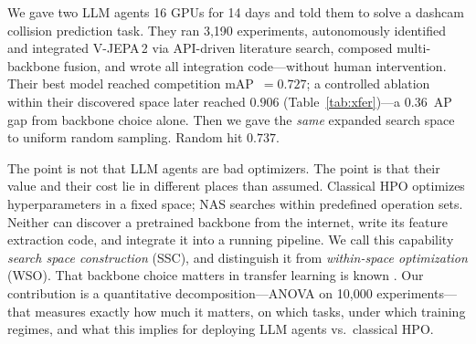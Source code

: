 \documentclass{article}
\begin{document}
We gave two LLM agents 16 GPUs for 14 days and told them to solve a dashcam collision prediction task.
They ran 3{,}190 experiments, autonomously identified and integrated V-JEPA\,2 via API-driven literature search, composed multi-backbone fusion, and wrote all integration code---without human intervention.
Their best model reached competition mAP~$= 0.727$; a controlled ablation within their discovered space later reached $0.906$ (Table~\ref{tab:xfer})---a 0.36~AP gap from backbone choice alone.
Then we gave the \emph{same} expanded search space to uniform random sampling.
Random hit $0.737$.

The point is not that LLM agents are bad optimizers. The point is that their value and their cost lie in different places than assumed.
Classical HPO \citep{bergstra2011algorithms, falkner2018bohb} optimizes hyperparameters in a fixed space; NAS \citep{liu2019darts, pham2018enas} searches within predefined operation sets.
Neither can discover a pretrained backbone from the internet, write its feature extraction code, and integrate it into a running pipeline.
We call this capability \emph{search space construction} (SSC), and distinguish it from \emph{within-space optimization} (WSO).
That backbone choice matters in transfer learning is known \citep{kornblith2019better, oquab2024dinov2}. Our contribution is a quantitative decomposition---ANOVA on 10{,}000 experiments---that measures exactly how much it matters, on which tasks, under which training regimes, and what this implies for deploying LLM agents vs.\ classical HPO.
\end{document}
